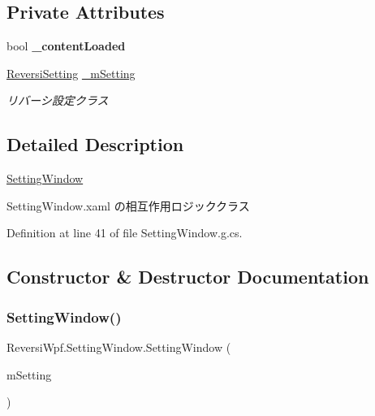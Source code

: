 \subsection*{Private Attributes}
\begin{DoxyCompactItemize}
\item 
\mbox{\label{class_reversi_wpf_1_1_setting_window_a3292f046bd59f1c388259fa342b1d2da}} 
bool {\bfseries \+\_\+content\+Loaded}
\item 
\mbox{\label{class_reversi_wpf_1_1_setting_window_ab1a8cdf50bdd626b51886422c58c8872}} 
\hyperlink{class_reversi_wpf_1_1_reversi_setting}{Reversi\+Setting} \hyperlink{class_reversi_wpf_1_1_setting_window_ab1a8cdf50bdd626b51886422c58c8872}{\+\_\+m\+Setting}
\begin{DoxyCompactList}\small\item\em リバーシ設定クラス \end{DoxyCompactList}\end{DoxyCompactItemize}


\subsection{Detailed Description}
\hyperlink{class_reversi_wpf_1_1_setting_window}{Setting\+Window} 

Setting\+Window.\+xaml の相互作用ロジッククラス

Definition at line 41 of file Setting\+Window.\+g.\+cs.



\subsection{Constructor \& Destructor Documentation}
\mbox{\label{class_reversi_wpf_1_1_setting_window_a6ea5c654540c8cded2c7bef2187d446e}} 
\subsubsection{\texorpdfstring{Setting\+Window()}{SettingWindow()}}
{\footnotesize\ttfamily Reversi\+Wpf.\+Setting\+Window.\+Setting\+Window (\begin{DoxyParamCaption}\item[{\hyperlink{class_reversi_wpf_1_1_reversi_setting}{Reversi\+Setting}}]{m\+Setting }\end{DoxyParamCaption})}



